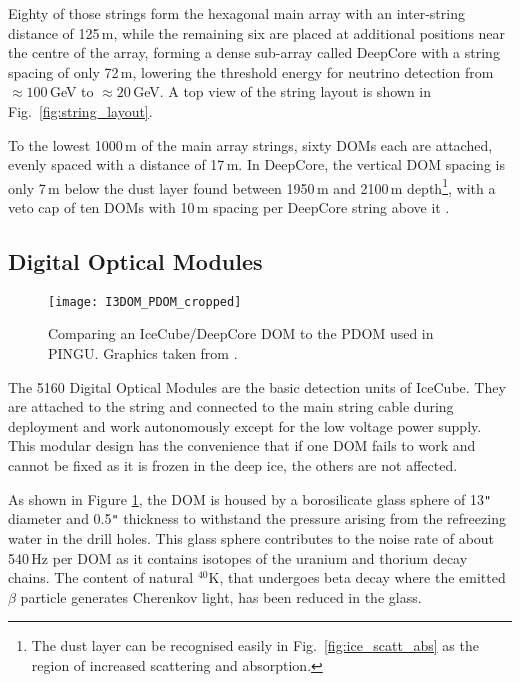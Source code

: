 Eighty of those strings form the hexagonal main array with an inter-string 
distance of 125\,m, while the remaining six are placed at additional positions 
near the centre of the array, forming a dense sub-array called DeepCore with a
string spacing 
of only 72\,m, lowering the threshold energy for neutrino detection from 
$\approx 100$\,GeV to $\approx 20$\,GeV. A top view of the string layout is 
shown in Fig.~\ref{fig:string_layout}.

To the lowest 1000\,m of the main array strings, sixty DOMs each are attached, 
evenly spaced with a distance of 17\,m. In DeepCore, the vertical DOM spacing 
is only 7\,m below the dust layer found between 1950\,m and 2100\,m 
depth\footnote{The dust layer can be recognised easily in 
Fig.~\ref{fig:ice_scatt_abs} as the region of increased scattering and 
absorption.}, with a veto cap of ten DOMs with 10\,m spacing per DeepCore 
string above it \cite{I3Design,DCDesign}.


\subsection{Digital Optical Modules}
\label{sec:ICDOM}

\begin{figure}[htp]
 \centering
 \texttt{[image: I3DOM\_PDOM\_cropped]}
 \caption{Comparing an IceCube/DeepCore DOM to the PDOM used in PINGU. Graphics 
taken from \cite{PDOM_Aachen}.}
 \label{fig:DOM}
\end{figure}

The 5160 Digital Optical Modules \cite{ICdom} are the basic detection units of 
IceCube. They 
are attached to the string and connected to the main string cable during 
deployment and work autonomously except for the low voltage power supply. This 
modular design has the convenience that if one DOM fails to work and cannot be 
fixed as it is frozen in the deep ice, the others are not affected.

As shown in Figure \ref{fig:DOM}, the DOM is housed by a borosilicate glass 
sphere of 13\verb+"+ diameter and 0.5\verb+"+ thickness to withstand the 
pressure arising from the refreezing water in the drill holes. This glass sphere 
 contributes to the noise rate of about 540\,Hz per DOM as it contains
isotopes of the uranium and thorium decay chains. The content of natural 
$^{40}\mathrm{K}$, that undergoes beta decay where the emitted $\beta$ particle
generates Cherenkov light, has been reduced in the glass.

